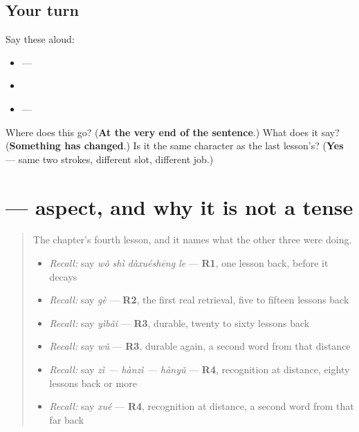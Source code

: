 \subsection*{Your turn}
Say these aloud:

\begin{itemize}
\raggedright
  \item {} — 
  \item {}
  \item {} — 
\end{itemize}

\begin{tcolorbox}[breakable,colback=teal!4,colframe=teal!35!black,title={Before you move on}]
Where does this  go? (\textbf{At the very end of the sentence}.) What does it say? (\textbf{Something has changed}.) Is it the same character as the last lesson's? (\textbf{Yes} — same two strokes, different slot, different job.)
\end{tcolorbox}
\section[\texorpdfstring{\zh{了} (le)}{了 (le)}]{ — aspect, and why it is not a tense}

\label{lesson:ZH-C25-ti}



\begin{quote}
The chapter's fourth lesson, and it names what the other three were doing.

\begin{itemize}
\raggedright
  \item \emph{Recall:} say \emph{wǒ shì dàxuéshēng le} — \textbf{R1}, one lesson back, before it decays
  \item \emph{Recall:} say \emph{gè} — \textbf{R2}, the first real retrieval, five to fifteen lessons back
  \item \emph{Recall:} say \emph{yìbǎi} — \textbf{R3}, durable, twenty to sixty lessons back
  \item \emph{Recall:} say \emph{wǔ} — \textbf{R3}, durable again, a second word from that distance
  \item \emph{Recall:} say \emph{zì — hànzì — hànyǔ} — \textbf{R4}, recognition at distance, eighty lessons back or more
  \item \emph{Recall:} say \emph{xué} — \textbf{R4}, recognition at distance, a second word from that far back
\end{itemize}
\end{quote}

